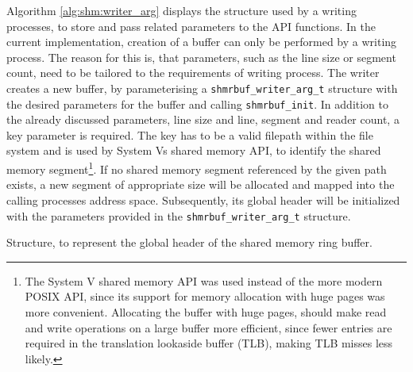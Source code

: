 Algorithm \ref{alg:shm:writer_arg} displays the structure used by a writing processes, to store and pass related parameters to the API functions.
In the current implementation, creation of a buffer can only be performed by a writing process. The reason for this is, that parameters, such as the line
size or segment count, need to be tailored to the requirements of writing process. The writer creates a new buffer, by parameterising a \texttt{shmrbuf\_writer\_arg\_t} structure with
the desired parameters for the buffer and calling \texttt{shmrbuf\_init}. In addition to the already discussed parameters, line size and line, segment and reader count, 
a key parameter is required. The key has to be a valid filepath within the file system and is used by System Vs shared memory API, to identify the shared memory segment\footnote{The System V shared memory API \cite{systemvshm} was used instead of the more modern POSIX API, since its support for memory allocation with huge pages was more convenient. Allocating the buffer with huge pages, should make read and write operations on a large buffer more efficient, since fewer entries are required in the translation lookaside buffer (TLB), making TLB misses less likely.}.  
If no shared memory segment referenced by the given path exists, a new segment of appropriate size will be allocated and mapped into the calling processes address space. Subsequently, its global header will 
be initialized with the parameters provided in the \texttt{shmrbuf\_writer\_arg\_t} structure.  

\begin{algorithm}[h!]
    
    \label{alg:shm:global_hdr}
    \caption[Shared Memory Ringbuffer: Global Header]{Structure, to represent the global header of the shared memory ring buffer.}
\end{algorithm}

